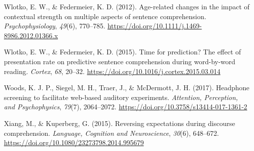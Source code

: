 \documentclass[a4paper, nobind]{templates/ociamthesis}
\newlength{\cslhangindent}
\newenvironment{CSLReferences}[2] %
 {%
  \setlength{\parindent}{0pt}
  \ifodd #1
  \let\oldpar\par
  \def\par{\hangindent=\cslhangindent\oldpar}
  \fi
  \setlength{\parskip}{1mm}
  \setlength{\baselineskip}{6mm}
 }%
 {}
\begin{document}
\begin{CSLReferences}{1}{0}
\leavevmode{}%
Wlotko, E. W., \& Federmeier, K. D. (2012). Age-related changes in the impact of contextual strength on multiple aspects of sentence comprehension. \emph{Psychophysiology}, \emph{49}(6), 770--785. \url{https://doi.org/10.1111/j.1469-8986.2012.01366.x}

\leavevmode{}%
Wlotko, E. W., \& Federmeier, K. D. (2015). {Time for prediction? The effect of presentation rate on predictive sentence comprehension during word-by-word reading}. \emph{Cortex}, \emph{68}, 20--32. \url{https://doi.org/10.1016/j.cortex.2015.03.014}

\leavevmode{}%
Woods, K. J. P., Siegel, M. H., Traer, J., \& McDermott, J. H. (2017). {Headphone screening to facilitate web-based auditory experiments}. \emph{Attention, Perception, and Psychophysics}, \emph{79}(7), 2064--2072. \url{https://doi.org/10.3758/s13414-017-1361-2}

\leavevmode{}%
Xiang, M., \& Kuperberg, G. (2015). {Reversing expectations during discourse comprehension}. \emph{Language, Cognition and Neuroscience}, \emph{30}(6), 648--672. \url{https://doi.org/10.1080/23273798.2014.995679}

\end{CSLReferences}

\end{document}
